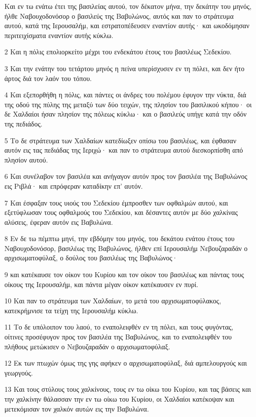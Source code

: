 \par Και εν τω ενάτω έτει της βασιλείας αυτού, τον δέκατον μήνα, την δεκάτην του μηνός, ήλθε Ναβουχοδονόσορ ο βασιλεύς της Βαβυλώνος, αυτός και παν το στράτευμα αυτού, κατά της Ιερουσαλήμ, και εστρατοπέδευσεν εναντίον αυτής· και ωκοδόμησαν περιτειχίσματα εναντίον αυτής κύκλω.
\par 2 Και η πόλις επολιορκείτο μέχρι του ενδεκάτου έτους του βασιλέως Σεδεκίου.
\par 3 Και την ενάτην του τετάρτου μηνός η πείνα υπερίσχυσεν εν τη πόλει, και δεν ήτο άρτος διά τον λαόν του τόπου.
\par 4 Και εξεπορθήθη η πόλις, και πάντες οι άνδρες του πολέμου έφυγον την νύκτα, διά της οδού της πύλης της μεταξύ των δύο τειχών, της πλησίον του βασιλικού κήπου· οι δε Χαλδαίοι ήσαν πλησίον της πόλεως κύκλω· και ο βασιλεύς υπήγε κατά την οδόν της πεδιάδος.
\par 5 Το δε στράτευμα των Χαλδαίων κατεδίωξεν οπίσω του βασιλέως, και έφθασαν αυτόν εις τας πεδιάδας της Ιεριχώ· και παν το στράτευμα αυτού διεσκορπίσθη από πλησίον αυτού.
\par 6 Και συνέλαβον τον βασιλέα και ανήγαγον αυτόν προς τον βασιλέα της Βαβυλώνος εις Ριβλά· και επρόφεραν καταδίκην επ' αυτόν.
\par 7 Και έσφαξαν τους υιούς του Σεδεκίου έμπροσθεν των οφθαλμών αυτού, και εξετύφλωσαν τους οφθαλμούς του Σεδεκίου, και δέσαντες αυτόν με δύο χαλκίνας αλύσεις, έφεραν αυτόν εις Βαβυλώνα.
\par 8 Εν δε τω πέμπτω μηνί, την εβδόμην του μηνός, του δεκάτου ενάτου έτους του Ναβουχοδονόσορ, βασιλέως της Βαβυλώνος, ήλθεν επί Ιερουσαλήμ Νεβουζαραδάν ο αρχισωματοφύλαξ, ο δούλος του βασιλέως της Βαβυλώνος·
\par 9 και κατέκαυσε τον οίκον του Κυρίου και τον οίκον του βασιλέως και πάντας τους οίκους της Ιερουσαλήμ, και πάντα μέγαν οίκον κατέκαυσεν εν πυρί.
\par 10 Και παν το στράτευμα των Χαλδαίων, το μετά του αρχισωματοφύλακος, κατεκρήμνισε τα τείχη της Ιερουσαλήμ κύκλω.
\par 11 Το δε υπόλοιπον του λαού, το εναπολειφθέν εν τη πόλει, και τους φυγόντας, οίτινες προσέφυγον προς τον βασιλέα της Βαβυλώνος, και το εναπολειφθέν του πλήθους μετώκισεν ο Νεβουζαραδάν ο αρχισωματοφύλαξ.
\par 12 Εκ των πτωχών όμως της γης αφήκεν ο αρχισωματοφύλαξ, διά αμπελουργούς και γεωργούς.
\par 13 Και τους στύλους τους χαλκίνους, τους εν τω οίκω του Κυρίου, και τας βάσεις και την χαλκίνην θάλασσαν την εν τω οίκω του Κυρίου, οι Χαλδαίοι κατέκοψαν και μετεκόμισαν τον χαλκόν αυτών εις την Βαβυλώνα.
